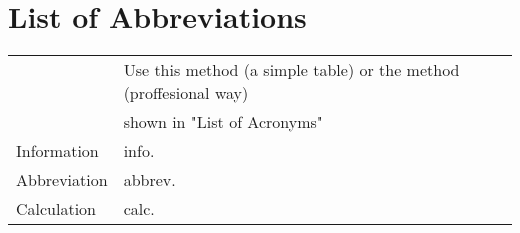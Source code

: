 \chapter*{List of Abbreviations}

\begin{longtable}[l]{l l}
	& Use this method (a simple table) or the method (proffesional way) \\
	& shown in "List of Acronyms" \\
Information & info. \\
Abbreviation & abbrev. \\
Calculation & calc. \\
\end{longtable}
